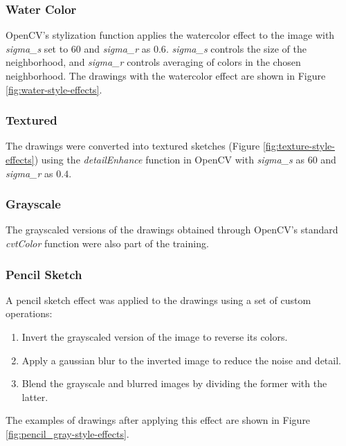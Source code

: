 \subsubsection{Water Color}

OpenCV's stylization function applies the watercolor effect to the image with \textit{sigma\_s} set to \begin{math} 60 \end{math} and \textit{sigma\_r} as \begin{math} 0.6 \end{math}. \textit{sigma\_s} controls the size of the neighborhood, and \textit{sigma\_r} controls averaging of colors in the chosen neighborhood. The drawings with the watercolor effect are shown in Figure \ref{fig:water-style-effects}.

\subsubsection{Textured}

The drawings were converted into textured sketches (Figure \ref{fig:texture-style-effects}) using the \textit{detailEnhance} function in OpenCV with \textit{sigma\_s} as \begin{math} 60 \end{math} and \textit{sigma\_r} as \begin{math} 0.4 \end{math}.

\subsubsection{Grayscale}
The grayscaled versions of the drawings obtained through OpenCV's standard \textit{cvtColor} function were also part of the training.

\subsubsection{Pencil Sketch}

A pencil sketch effect was applied to the drawings using a set of custom operations:
\begin{enumerate}
    \item Invert the grayscaled version of the image to reverse its colors.
    \item Apply a gaussian blur to the inverted image to reduce the noise and detail.
    \item Blend the grayscale and blurred images by dividing the former with the latter.
\end{enumerate}
The examples of drawings after applying this effect are shown in Figure \ref{fig:pencil_gray-style-effects}.

